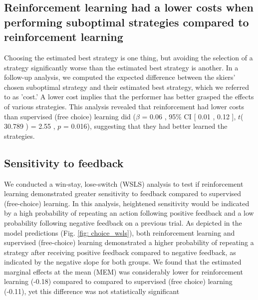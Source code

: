 \documentclass{article}
\begin{document}
\subsection{Reinforcement learning had a lower costs when performing suboptimal strategies compared to  reinforcement learning}\label{subsubsec3}
Choosing the estimated best strategy is one thing, but avoiding the selection of a strategy significantly worse than the estimated best strategy is another. In a follow-up analysis, we computed the expected difference between the skiers' chosen suboptimal strategy and their estimated best strategy, which we referred to as 'cost.' A lower cost implies that the performer has better grasped the effects of various strategies. This analysis revealed that reinforcement had lower costs than supervised (free choice) learning did  ($\beta$ = 0.06 , 95\% CI [ 0.01 ,  0.12 ], $t$( 30.789 ) = 2.55 , $p$  =  0.016), suggesting that they had better learned the strategies.



\subsection{Sensitivity to feedback}\label{subsec5}
We conducted a win-stay, lose-switch (WSLS) analysis to test if reinforcement learning demonstrated greater sensitivity to feedback compared to supervised (free-choice) learning. In this analysis, heightened sensitivity would be indicated by a high probability of repeating an action following positive feedback and a low probability following negative feedback on a previous trial. As depicted in the model predictions (Fig. \ref{fig: choice_wsls}), both reinforcement learning and supervised (free-choice) learning demonstrated a higher probability of repeating a strategy after receiving positive feedback compared to negative feedback, as indicated by the negative slope for both groups. We found that the estimated marginal effects at the mean (MEM) was considerably lower for reinforcement learning (-0.18) compared to compared to supervised (free choice) learning (-0.11), yet this difference was not statistically significant %
\end{document}
